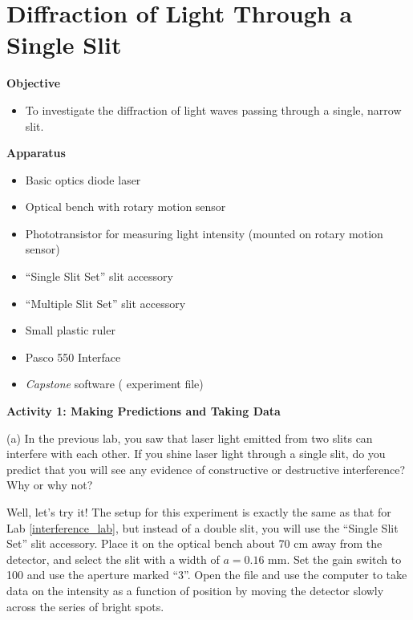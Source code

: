 
\section{Diffraction of Light Through a Single Slit}

\makelabheader %

\medskip
\textbf{Objective}

\begin{itemize}
\item To investigate the diffraction of light waves passing through
a single, narrow slit. 
\end{itemize}
\textbf{Apparatus}

\begin{itemize}
\item Basic optics diode laser
\item Optical bench with rotary motion sensor
\item Phototransistor for measuring light intensity (mounted on rotary motion sensor)
\item ``Single Slit Set'' slit accessory
\item ``Multiple Slit Set'' slit accessory
\item Small plastic ruler
\item Pasco 550 Interface
\item \textit{Capstone} software ( experiment file)
\end{itemize}

\textbf{Activity 1: Making Predictions and Taking Data}

(a) In the previous lab, you saw that laser light emitted from two slits can interfere with each other.  If you shine laser light through a single slit, do you predict that you will see any evidence of constructive or destructive interference?  Why or why not?
\answerspace{0.8in}


Well, let's try it!  The setup for this experiment is exactly the same as that for Lab \ref{interference_lab},  but instead of a double slit, you will use the ``Single Slit Set'' slit accessory.  Place it on the optical bench about 70 cm away from the detector, and select the slit with a width of $a = 0.16$ mm.   Set the gain switch to 100 and use the aperture marked ``3''.   Open the file  and use the computer to take data on the intensity as a function of position by moving the detector slowly across the series of bright spots.  

